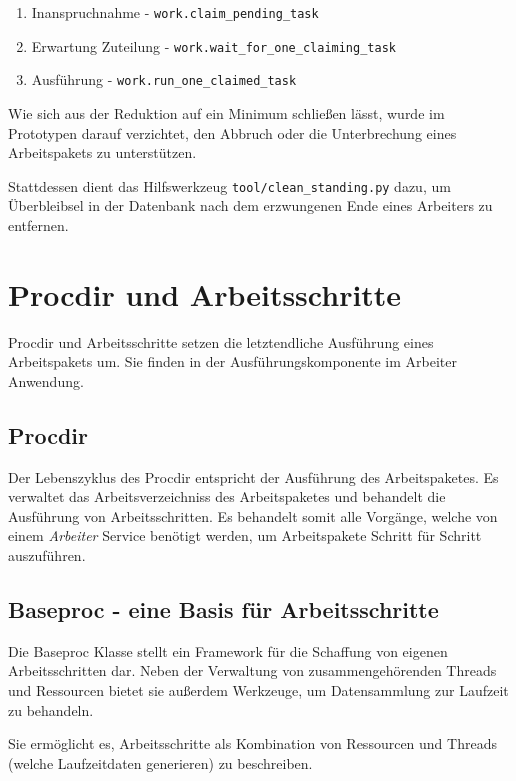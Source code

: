 \begin{enumerate}
    \item Inanspruchnahme - \verb|work.claim_pending_task|
    \item Erwartung Zuteilung - \verb|work.wait_for_one_claiming_task|
    \item Ausführung - \verb|work.run_one_claimed_task|
\end{enumerate}

Wie sich aus der Reduktion auf ein Minimum schließen lässt,
wurde im Prototypen darauf verzichtet, den Abbruch oder die Unterbrechung
eines Arbeitspakets zu unterstützen.

Stattdessen dient das Hilfswerkzeug \verb|tool/clean_standing.py| dazu,
um Überbleibsel in der Datenbank nach dem erzwungenen Ende
eines Arbeiters zu entfernen.



\section{Procdir und Arbeitsschritte}
\label{sec:imp:procdir}

Procdir und Arbeitsschritte setzen die letztendliche Ausführung eines Arbeitspakets um.
Sie finden in der Ausführungskomponente im Arbeiter Anwendung.


\subsection{Procdir}

Der Lebenszyklus des Procdir entspricht der Ausführung des Arbeitspaketes.
Es verwaltet das Arbeitsverzeichniss des Arbeitspaketes und behandelt die Ausführung von Arbeitsschritten.
Es behandelt somit alle Vorgänge, welche von einem \emph{Arbeiter} Service benötigt werden, um  Arbeitspakete Schritt für Schritt auszuführen.

\subsection{Baseproc - eine Basis für Arbeitsschritte}

Die Baseproc Klasse stellt ein Framework für die Schaffung von eigenen Arbeitsschritten dar.
Neben der Verwaltung von zusammengehörenden Threads und Ressourcen bietet sie außerdem Werkzeuge, um Datensammlung zur Laufzeit zu behandeln.

Sie ermöglicht es, Arbeitsschritte als Kombination von Ressourcen und Threads (welche Laufzeitdaten generieren) zu beschreiben.


